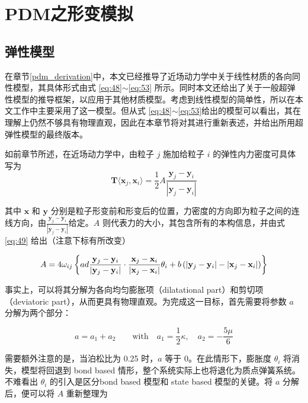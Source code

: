 ﻿\chapter{PDM之形变模拟}

\section{弹性模型}
\label{elasitcity_model}

在章节\ref{pdm_derivation}中，本文已经推导了近场动力学中关于线性材质的各向同性模型，其具体形式由式 \ref{eq:48}$\sim$\ref{eq:53} 所示。同时本文还给出了关于一般超弹性模型的推导框架，以应用于其他材质模型。考虑到线性模型的简单性，所以在本文工作中主要采用了这一模型。但从式 \ref{eq:48}$\sim$\ref{eq:53}给出的模型可以看出，其在理解上仍然不够具有物理直观，因此在本章节将对其进行重新表述，并给出所用超弹性模型的最终版本。

如前章节所述，在近场动力学中，由粒子 $j$ 施加给粒子 $i$ 的弹性内力密度可具体写为
\begin{equation}
\mathbf{T}\langle\mathbf{x}_j,\mathbf{x}_i\rangle = \frac{1}{2}A\frac{\mathbf{y}_j-\mathbf{y}_i}{|\mathbf{y}_j-\mathbf{y}_i|}
\end{equation}

其中 $\mathbf{x}$ 和 $\mathbf{y}$ 分别是粒子形变前和形变后的位置，力密度的方向即为粒子之间的连线方向，由$\frac{\mathbf{y}_j-\mathbf{y}_i}{|\mathbf{y}_j-\mathbf{y}_i|}$给定。$A$ 则代表力的大小，其包含所有的本构信息，并由式 \ref{eq:49} 给出（注意下标有所改变）

\begin{equation}
A = 4\omega_{ij}\left\{ad\frac{\mathbf{y}_j-\mathbf{y}_i}{|\mathbf{y}_j-\mathbf{y}_i|}\cdot\frac{\mathbf{x}_j-\mathbf{x}_i}{|\mathbf{x}_j-\mathbf{x}_i|}\theta_i
   +b\left(|\mathbf{y}_j - \mathbf{y}_i| - |\mathbf{x}_j - \mathbf{x}_i|\right) \right\}
\end{equation}

事实上，可以将其分解为各向均匀膨胀项（dilatational part）和剪切项（deviatoric part），从而更具有物理直观。为完成这一目标，首先需要将参数 $a$ 分解为两个部分：

\begin{equation}
a = a_1 + a_2 \qquad \mathrm{with}\quad a_1 = \frac{1}{2}\kappa ,\quad a_2 = -\frac{5\mu}{6}
\end{equation}

需要额外注意的是，当泊松比为 0.25 时，$a$ 等于 0。在此情形下，膨胀度 $\theta_i$ 将消失，模型将回退到 bond based 情形，整个系统实际上也将退化为质点弹簧系统。不难看出 $\theta_i$ 的引入是区分bond based 模型和 state based 模型的关键。将 $a$ 分解后，便可以将 $A$ 重新整理为

